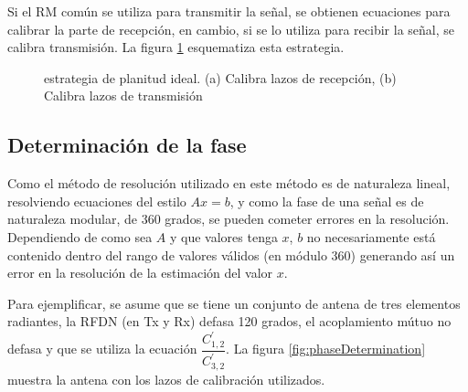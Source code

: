 Si el RM común se utiliza para transmitir la señal, se obtienen ecuaciones para calibrar la parte de recepción, en cambio, 
si se lo utiliza para recibir la señal, se calibra transmisión. La figura \ref{fig:ideal_strategy} esquematiza esta estrategia.

\begin{figure}[H]
 \centering
 \caption{estrategia de planitud ideal. (a) Calibra lazos de recepción, (b) Calibra lazos de transmisión}
 \label{fig:ideal_strategy}
\end{figure}

\subsection{Determinación de la fase}

Como el método de resolución utilizado en este método es de naturaleza lineal, resolviendo ecuaciones del estilo $Ax = b$, y 
como la fase de una señal es de naturaleza modular, de 360 grados, se pueden cometer errores en la resolución. Dependiendo de 
como sea $A$ y que valores tenga $x$, $b$ no necesariamente está contenido dentro del rango de valores válidos (en módulo 360)
generando así un error en la resolución de la estimación del valor $x$. 

Para ejemplificar, se asume que se tiene un conjunto de antena de tres elementos radiantes, la RFDN (en Tx y Rx) defasa 120 
grados, el acoplamiento mútuo no defasa y que se utiliza la ecuación $\dfrac{C^{'}_{1,2}}{C^{'}_{3, 2}}$. La figura 
\ref{fig:phaseDetermination} muestra la antena con los lazos de calibración utilizados.


